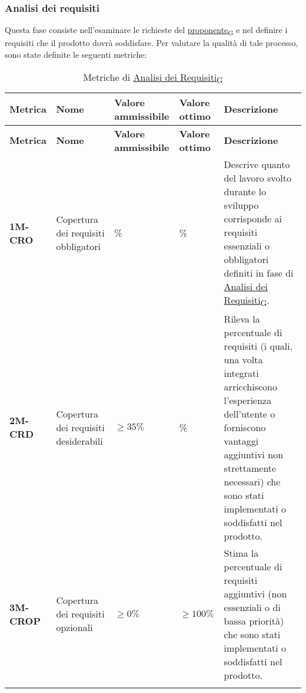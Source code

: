 \subsubsection{Analisi dei requisiti}
Questa fase consiste nell'esaminare le richieste del \href{https://7last.github.io/docs/rtb/documentazione-interna/glossario\#proponente}{proponente\textsubscript{G}} e nel definire i requisiti che il prodotto dovrà soddisfare. Per valutare la qualità di tale processo, sono state definite le seguenti metriche:
\begin{longtable}{|>{\raggedright\arraybackslash}m{}|>{\raggedright\arraybackslash}m{}|>{\raggedright\arraybackslash}m{}|>{\raggedright\arraybackslash}m{}|>{\raggedright\arraybackslash}m{}|}
	\hline
	\textbf{Metrica} & \textbf{Nome} & \textbf{Valore ammissibile} & \textbf{Valore ottimo} & \textbf{Descrizione}\\
	\hline
	\endfirsthead
	\hline
	\textbf{Metrica} & \textbf{Nome} & \textbf{Valore ammissibile} & \textbf{Valore ottimo} & \textbf{Descrizione}\\
	\endhead
	\textbf{1M-CRO}  & Copertura dei requisiti obbligatori  & 100\% & 100\% & Descrive quanto del lavoro svolto durante lo sviluppo corrisponde ai requisiti essenziali o obbligatori definiti in fase di \href{https://7last.github.io/docs/rtb/documentazione-interna/glossario\#analisi-dei-requisiti}{Analisi dei Requisiti\textsubscript{G}}.\\
	\hline
	\textbf{2M-CRD}  & Copertura dei requisiti desiderabili & $\geq 35\% $ & 100\% & Rileva la percentuale di requisiti (i quali, una volta integrati arricchiscono l'esperienza dell'utente o forniscono vantaggi aggiuntivi non strettamente necessari) che sono stati implementati o soddisfatti nel prodotto. \\
	\hline
	\textbf{3M-CROP} & Copertura dei requisiti opzionali & $\geq 0\% $ & $\geq 100\% $ & Stima la percentuale di requisiti aggiuntivi (non essenziali o di bassa priorità) che sono stati implementati o soddisfatti nel prodotto.\\
	\hline
	\caption{Metriche di \href{https://7last.github.io/docs/rtb/documentazione-interna/glossario\#analisi-dei-requisiti}{Analisi dei Requisiti\textsubscript{G}}}
	\label{table:1}
\end{longtable}

